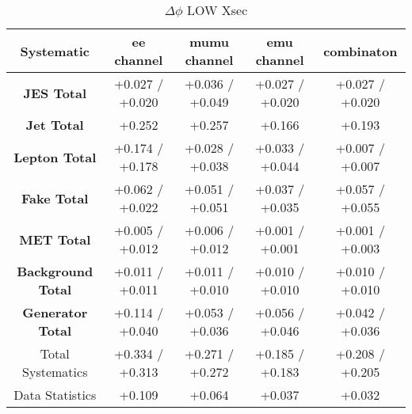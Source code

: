 \begin{table}[htbp]
\scriptsize
  \begin{center} 
  \begin{tabular}{|c|c|c|c|c|}
  \hline
   Systematic                            &  ee channel&  mumu channel&  emu channel&  combinaton\\
 \hline
\textbf{JES Total}                    &+0.027   / +0.020   & +0.036   / +0.049   & +0.027   / +0.020   & +0.027   / +0.020  \\
\textbf{Jet Total}                    &+0.252              & +0.257              & +0.166              & +0.193             \\
\textbf{Lepton Total}                 &+0.174   / +0.178   & +0.028   / +0.038   & +0.033   / +0.044   & +0.007   / +0.007  \\
\textbf{Fake Total}                   &+0.062   / +0.022   & +0.051   / +0.051   & +0.037   / +0.035   & +0.057   / +0.055  \\
\textbf{MET Total}                    &+0.005   / +0.012   & +0.006   / +0.012   & +0.001   / +0.001   & +0.001   / +0.003  \\
\textbf{Background Total}             &+0.011   / +0.011   & +0.011   / +0.010   & +0.010   / +0.010   & +0.010   / +0.010  \\
\textbf{Generator Total}              &+0.114   / +0.040   & +0.053   / +0.036   & +0.056   / +0.046   & +0.042   / +0.036  \\
  \hline
  \hline
Total Systematics                     &+0.334   / +0.313   & +0.271   / +0.272   & +0.185   / +0.183   & +0.208   / +0.205  \\
Data Statistics                       &+0.109              & +0.064              & +0.037              & +0.032             \\
  \hline
  \end{tabular}
  \end{center} 
  \label{tab:xsec_nominal_deltaPhi_low}
  \caption{$\Delta\phi$ LOW Xsec}
\end{table}

